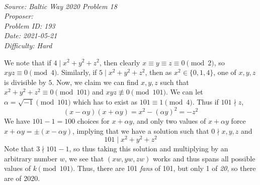 \SSbreak\\
\emph{Source: Baltic Way 2020 Problem 18}\\
\emph{Proposer: \Phyper}\\ %
\emph{Problem ID: 193}\\
\emph{Date: 2021-05-21}\\
\emph{Difficulty: Hard}\\
\SSbreak

\bigskip

\begin{solution}\hfil\medskip

We note that if $4\mid x^2+y^2+z^2$, then clearly $x\equiv y\equiv z\equiv 0\pmod 2$, so $xyz\equiv 0\pmod 4$. Similarly, if $5\mid x^2+y^2+z^2$, then as $x^2\in\{0,1,4\}$, one of $x,y,z$ is divisible by $5$. Now, we claim we can find $x,y,z$ such that $x^2+y^2+z^2\equiv 0\pmod{101}$ and $xyz\not\equiv 0\pmod{101}$. We can let $\alpha=\sqrt{-1}\pmod{101}$ which has to exist as $101\equiv 1\pmod 4$. Thus if $101\nmid z$,
\[(x-\alpha y)(x+\alpha y)=x^2-(\alpha y)^2=-z^2\]
We have $101-1=100$ choices for $x+\alpha y$, and only two values of $x+\alpha y$ force $x+\alpha y=\pm (x-\alpha y)$, implying that we have a solution such that $0\nmid x,y,z$ and
\[101\mid x^2+y^2+z^2\]
Note that $3\nmid 101-1$, so thus taking this solution and multiplying by an arbitrary number $w$, we see that $(xw,yw,zw)$ works and thus spans all possible values of $k\pmod{101}$. Thus, there are 101 \emph{fans} of 101, but only 1 of \emph{20}, so there are  of 2020.
\end{solution}\bigskip
